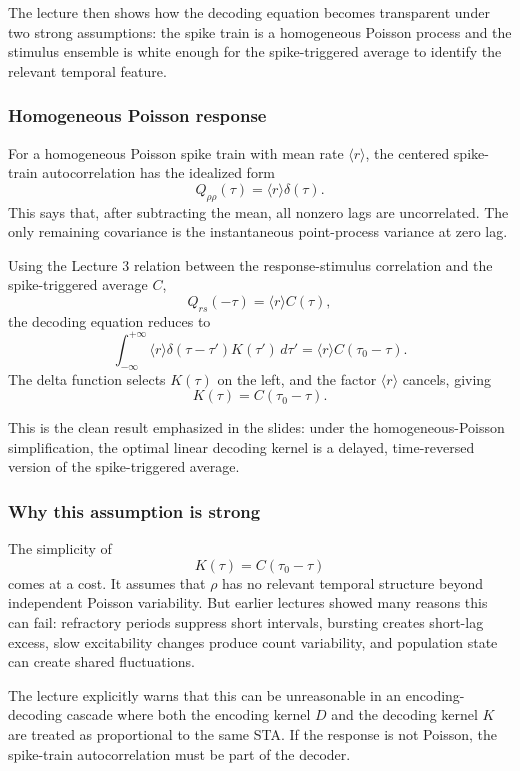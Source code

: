 The lecture then shows how the decoding equation becomes transparent under two strong assumptions: the spike train is a homogeneous Poisson process and the stimulus ensemble is white enough for the spike-triggered average to identify the relevant temporal feature.

\subsubsection{Homogeneous Poisson response}

For a homogeneous Poisson spike train with mean rate $\langle r\rangle$, the centered spike-train autocorrelation has the idealized form
\[
    Q_{\rho\rho}(\tau)=\langle r\rangle \delta(\tau).
\]
This says that, after subtracting the mean, all nonzero lags are uncorrelated. The only remaining covariance is the instantaneous point-process variance at zero lag.

Using the Lecture 3 relation between the response-stimulus correlation and the spike-triggered average $C$,
\[
    Q_{rs}(-\tau)=\langle r\rangle C(\tau),
\]
the decoding equation reduces to
\[
    \int_{-\infty}^{+\infty}
    \langle r\rangle \delta(\tau-\tau')K(\tau')\,d\tau'
    =
    \langle r\rangle C(\tau_0-\tau).
\]
The delta function selects $K(\tau)$ on the left, and the factor $\langle r\rangle$ cancels, giving
\[
    K(\tau)=C(\tau_0-\tau).
\]

This is the clean result emphasized in the slides: under the homogeneous-Poisson simplification, the optimal linear decoding kernel is a delayed, time-reversed version of the spike-triggered average.

\subsubsection{Why this assumption is strong}

The simplicity of
\[
    K(\tau)=C(\tau_0-\tau)
\]
comes at a cost. It assumes that $\rho$ has no relevant temporal structure beyond independent Poisson variability. But earlier lectures showed many reasons this can fail: refractory periods suppress short intervals, bursting creates short-lag excess, slow excitability changes produce count variability, and population state can create shared fluctuations.

The lecture explicitly warns that this can be unreasonable in an encoding-decoding cascade where both the encoding kernel $D$ and the decoding kernel $K$ are treated as proportional to the same STA. If the response is not Poisson, the spike-train autocorrelation must be part of the decoder.

